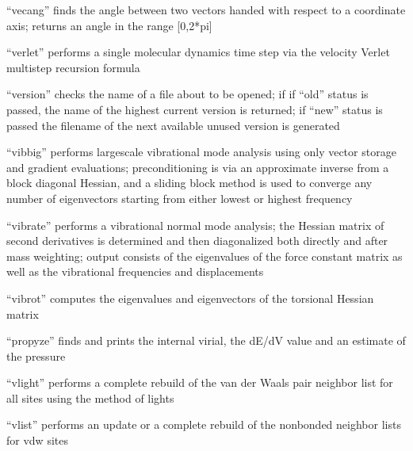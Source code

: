 \documentclass[letterpaper,11pt,english]{sphinxmanual}
\begin{document}

“vecang” finds the angle between two vectors handed with respect
to a coordinate axis; returns an angle in the range {[}0,2*pi{]}


“verlet” performs a single molecular dynamics time step
via the velocity Verlet multistep recursion formula


“version” checks the name of a file about to be opened; if
if “old” status is passed, the name of the highest current
version is returned; if “new” status is passed the filename
of the next available unused version is generated


“vibbig” performs large\sphinxhyphen{}scale vibrational mode analysis using
only vector storage and gradient evaluations; preconditioning
is via an approximate inverse from a block diagonal Hessian,
and a sliding block method is used to converge any number of
eigenvectors starting from either lowest or highest frequency


“vibrate” performs a vibrational normal mode analysis; the
Hessian matrix of second derivatives is determined and then
diagonalized both directly and after mass weighting; output
consists of the eigenvalues of the force constant matrix as
well as the vibrational frequencies and displacements


“vibrot” computes the eigenvalues and eigenvectors of the
torsional Hessian matrix


“propyze” finds and prints the internal virial, the dE/dV value
and an estimate of the pressure


“vlight” performs a complete rebuild of the van der Waals
pair neighbor list for all sites using the method of lights


“vlist” performs an update or a complete rebuild of the
nonbonded neighbor lists for vdw sites

\end{document}
